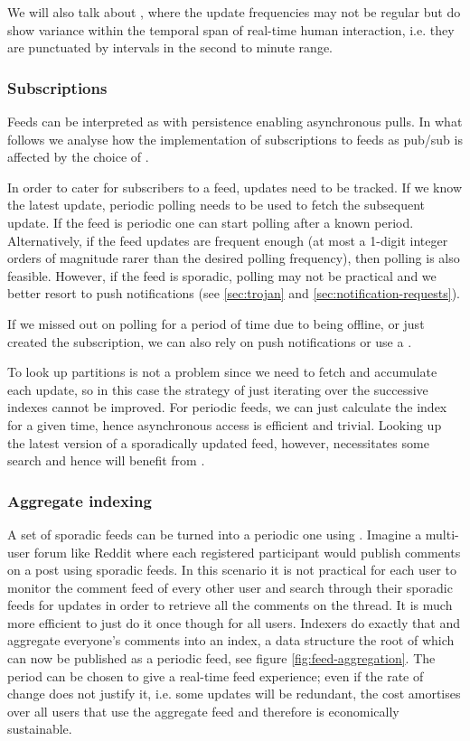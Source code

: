 We will also talk about , where the update frequencies may not be regular but do show variance within the temporal span of real-time human interaction, i.e. they are punctuated by intervals in the second to minute range.

\subsubsection{Subscriptions}

Feeds can be interpreted as  with persistence enabling asynchronous pulls. In what follows we analyse how the implementation of subscriptions to feeds as pub/sub is affected by the choice of .

In order to cater for subscribers to a feed, updates need to be tracked. If we know the latest update, periodic polling needs to be used to fetch the subsequent update. 
If the feed is periodic one can start polling after a known period. Alternatively, if the feed updates are frequent enough (at most a 1-digit integer orders of magnitude rarer than the desired polling frequency), then polling is also feasible.
However, if the feed is sporadic, polling may not be practical and we better resort to push notifications (see \ref{sec:trojan} and \ref{sec:notification-requests}).

If we missed out on polling for a period of time due to being offline, or just created the subscription, we can also rely on push notifications or use a . 

To look up partitions is not a problem since we need to fetch and accumulate each update, so in this case the strategy of just iterating over the successive indexes cannot be improved.
For periodic feeds, we can just calculate the index for a given time, hence asynchronous access is efficient and trivial. 
Looking up the latest version of a sporadically updated feed, however, necessitates some search and hence 
will benefit from .



\subsubsection{Aggregate indexing}

A set of sporadic feeds can be turned into a periodic one using . Imagine a multi-user forum like Reddit where each registered participant would publish comments on a post using sporadic feeds. In this scenario it is not practical for each user to monitor the comment feed of every other user and search through their sporadic feeds for updates in order to retrieve all the comments on the thread. It is much more efficient to just do it once though for all users. Indexers do exactly that and aggregate everyone's comments into an index, a data structure the root of which can now be published as a periodic feed, see figure \ref{fig:feed-aggregation}. The period can be chosen to give a real-time feed experience; even if the rate of change does not justify it, i.e. some updates will be redundant, the cost amortises over all users that use the aggregate feed and therefore is economically sustainable. 

